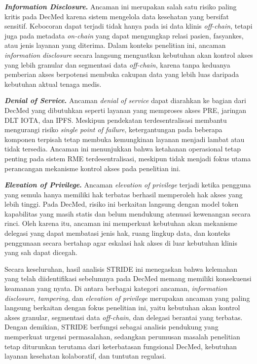 \textbf{\textit{Information Disclosure}.} Ancaman ini merupakan salah satu risiko paling kritis pada DecMed karena sistem mengelola data kesehatan yang bersifat sensitif. Kebocoran dapat terjadi tidak hanya pada isi data klinis \textit{off-chain}, tetapi juga pada metadata \textit{on-chain} yang dapat mengungkap relasi pasien, fasyankes, atau jenis layanan yang diterima. Dalam konteks penelitian ini, ancaman \textit{information disclosure} secara langsung menguatkan kebutuhan akan kontrol akses yang lebih granular dan segmentasi data \textit{off-chain}, karena tanpa keduanya pemberian akses berpotensi membuka cakupan data yang lebih luas daripada kebutuhan aktual tenaga medis.

\textbf{\textit{Denial of Service}.} Ancaman \textit{denial of service} dapat diarahkan ke bagian dari DecMed yang dibutuhkan seperti layanan yang memproses akses PRE, jaringan DLT IOTA, dan IPFS. Meskipun pendekatan terdesentralisasi membantu mengurangi risiko \textit{single point of failure}, ketergantungan pada beberapa komponen terpisah tetap membuka kemungkinan layanan menjadi lambat atau tidak tersedia. Ancaman ini menunjukkan bahwa ketahanan operasional tetap penting pada sistem RME terdesentralisasi, meskipun tidak menjadi fokus utama perancangan mekanisme kontrol akses pada penelitian ini.

\textbf{\textit{Elevation of Privilege}.} Ancaman \textit{elevation of privilege} terjadi ketika pengguna yang semula hanya memiliki hak terbatas berhasil memperoleh hak akses yang lebih tinggi. Pada DecMed, risiko ini berkaitan langsung dengan model token kapabilitas yang masih statis dan belum mendukung atenuasi kewenangan secara rinci. Oleh karena itu, ancaman ini memperkuat kebutuhan akan mekanisme delegasi yang dapat membatasi jenis hak, ruang lingkup data, dan konteks penggunaan secara bertahap agar eskalasi hak akses di luar kebutuhan klinis yang sah dapat dicegah.

Secara keseluruhan, hasil analisis STRIDE ini menegaskan bahwa kelemahan yang telah diidentifikasi sebelumnya pada DecMed memang memiliki konsekuensi keamanan yang nyata. Di antara berbagai kategori ancaman, \textit{information disclosure}, \textit{tampering}, dan \textit{elevation of privilege} merupakan ancaman yang paling langsung berkaitan dengan fokus penelitian ini, yaitu kebutuhan akan kontrol akses granular, segmentasi data \textit{off-chain}, dan delegasi berantai yang terbatas. Dengan demikian, STRIDE berfungsi sebagai analisis pendukung yang memperkuat urgensi permasalahan, sedangkan perumusan masalah penelitian tetap diturunkan terutama dari keterbatasan fungsional DecMed, kebutuhan layanan kesehatan kolaboratif, dan tuntutan regulasi.
